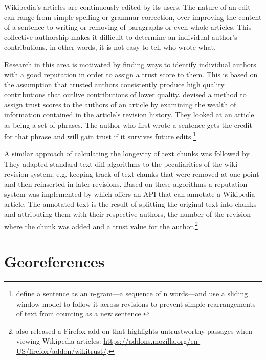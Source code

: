 Wikipedia's articles are continuously edited by its users.
The nature of an edit can range from simple spelling or grammar correction, over improving the content of a sentence to writing or removing of paragraphs or even whole articles. 
This collective authorship makes it difficult to determine an individual author's contributions, in other words, it is not easy to tell who wrote what.

Research in this area is motivated by finding ways to identify individual authors with a good reputation in order to assign a trust score to them.
This is based on the assumption that trusted authors consistently produce high quality contributions that outlive contributions of lower quality.
\textcite{kramer2008wiki} devised a method to assign trust scores to the authors of an article by examining the wealth of information contained in the article's revision history.
They looked at an article as being a set of phrases.
The author who first wrote a sentence gets the credit for that phrase and will gain trust if it survives future edits.\footnote{\textcite{kramer2008wiki} define a sentence as an n-gram---a sequence of n words---and use a sliding window model to follow it across revisions to prevent simple rearrangements of text from counting as a new sentence.}

A similar approach of calculating the longevity of text chunks was followed by \textcite{adler2007content}.
They adapted standard text-diff algorithms to the peculiarities of the wiki revision system, e.g. keeping track of text chunks that were removed at one point and then reinserted in later revisions.
Based on these algorithms a reputation system was implemented by \textcite{adler2008assigning} which offers an API that can annotate a Wikipedia article.
The annotated text is the result of splitting the original text into chunks and attributing them with their respective authors, the number of the revision where the chunk was added and a trust value for the author.\footnote{\citeauthor{adler2008assigning} also released a Firefox add-on that highlights untrustworthy passages when viewing Wikipedia articles: \url{https://addons.mozilla.org/en-US/firefox/addon/wikitrust/}.}


\section{Georeferences}\label{sec:georeference}


